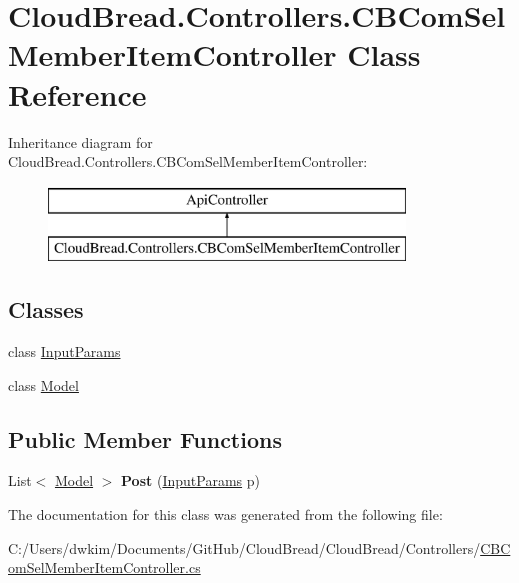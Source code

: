 \hypertarget{a00032}{}\section{Cloud\+Bread.\+Controllers.\+C\+B\+Com\+Sel\+Member\+Item\+Controller Class Reference}
\label{a00032}
Inheritance diagram for Cloud\+Bread.\+Controllers.\+C\+B\+Com\+Sel\+Member\+Item\+Controller\+:\begin{figure}[H]
\begin{center}
\leavevmode
\includegraphics[height=2.000000cm]{a00032}
\end{center}
\end{figure}
\subsection*{Classes}
\begin{DoxyCompactItemize}
\item 
class \hyperlink{a00121}{Input\+Params}
\item 
class \hyperlink{a00159}{Model}
\end{DoxyCompactItemize}
\subsection*{Public Member Functions}
\begin{DoxyCompactItemize}
\item 
List$<$ \hyperlink{a00159}{Model} $>$ {\bfseries Post} (\hyperlink{a00121}{Input\+Params} p)\hypertarget{a00032_aea063fa18a972ddbe9741f3c1d17af63}{}\label{a00032_aea063fa18a972ddbe9741f3c1d17af63}

\end{DoxyCompactItemize}


The documentation for this class was generated from the following file\+:\begin{DoxyCompactItemize}
\item 
C\+:/\+Users/dwkim/\+Documents/\+Git\+Hub/\+Cloud\+Bread/\+Cloud\+Bread/\+Controllers/\hyperlink{a00205}{C\+B\+Com\+Sel\+Member\+Item\+Controller.\+cs}\end{DoxyCompactItemize}
